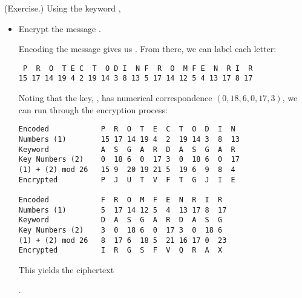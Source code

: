 \documentclass[letterpaper]{article}
\begin{document}
\begin{mdframed}
    (Exercise.) Using the keyword , 
    \begin{itemize}
        \item Encrypt the message .
        \begin{mdframed}
            Encoding the message gives us . From there, we can label each letter:
            \begin{mdframed}
                \begin{verbatim}
 P  R  O  T E C  T  O D I  N F  R  O  M F E  N  R I  R
15 17 14 19 4 2 19 14 3 8 13 5 17 14 12 5 4 13 17 8 17\end{verbatim}
            \end{mdframed}
            Noting that the key, , has numerical correspondence $(0, 18, 6, 0, 17, 3)$, we can run through the encryption process: 
            \begin{mdframed}
\begin{verbatim}
Encoded            P  R  O  T  E  C  T  O  D  I  N
Numbers (1)        15 17 14 19 4  2  19 14 3  8  13 
Keyword            A  S  G  A  R  D  A  S  G  A  R
Key Numbers (2)    0  18 6  0  17 3  0  18 6  0  17
(1) + (2) mod 26   15 9  20 19 21 5  19 6  9  8  4
Encrypted          P  J  U  T  V  F  T  G  J  I  E

Encoded            F  R  O  M  F  E  N  R  I  R
Numbers (1)        5  17 14 12 5  4  13 17 8  17
Keyword            D  A  S  G  A  R  D  A  S  G
Key Numbers (2)    3  0  18 6  0  17 3  0  18 6
(1) + (2) mod 26   8  17 6  18 5  21 16 17 0  23
Encrypted          I  R  G  S  F  V  Q  R  A  X\end{verbatim}
            \end{mdframed}
            This yields the ciphertext 
            \begin{mdframed}
                .
            \end{mdframed}
        \end{mdframed}


\end{itemize}
\end{mdframed}
\end{document}
